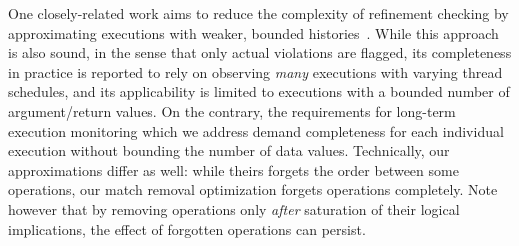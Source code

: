 One closely-related work aims to reduce the complexity of refinement checking
by approximating executions with weaker, bounded
histories~\cite{conf/popl/BouajjaniEEH15}. While this approach is also sound,
in the sense that only actual violations are flagged, its completeness in
practice is reported to rely on observing \emph{many} executions with varying
thread schedules, and its applicability is limited to executions with a bounded
number of argument/return values. On the contrary, the requirements for
long-term execution monitoring which we address demand completeness for each
individual execution without bounding the number of data values. Technically,
our approximations differ as well: while theirs forgets the order between some
operations, our match removal optimization forgets operations completely. Note
however that by removing operations only \emph{after} saturation of their
logical implications, the effect of forgotten operations can persist.
